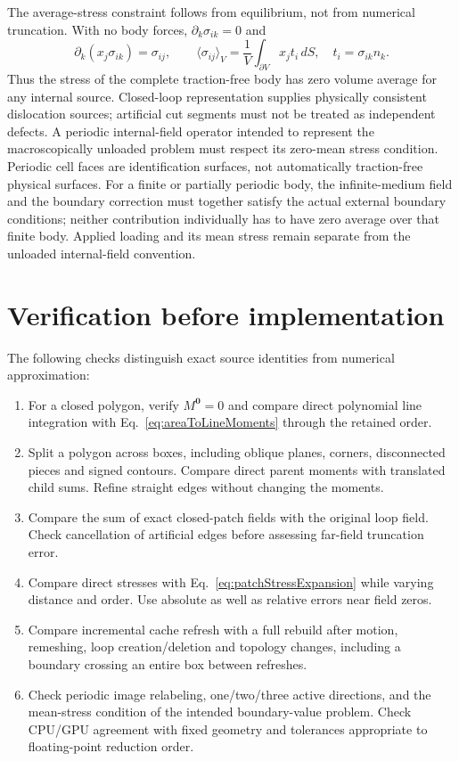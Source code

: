 The average-stress constraint follows from equilibrium, not from numerical truncation. With no body forces, $\partial_k\sigma_{ik}=0$ and
\begin{equation}
 \partial_k(x_j\sigma_{ik})=\sigma_{ij},\qquad
 \boxed{\langle\sigma_{ij}\rangle_V
 =\frac1V\int_{\partial V}x_jt_i\,dS,\quad t_i=\sigma_{ik}n_k.}
 \label{eq:patchAverageStress}
\end{equation}
Thus the stress of the complete traction-free body has zero volume average for any internal source. Closed-loop representation supplies physically consistent dislocation sources; artificial cut segments must not be treated as independent defects. A periodic internal-field operator intended to represent the macroscopically unloaded problem must respect its zero-mean stress condition. Periodic cell faces are identification surfaces, not automatically traction-free physical surfaces. For a finite or partially periodic body, the infinite-medium field and the boundary correction must together satisfy the actual external boundary conditions; neither contribution individually has to have zero average over that finite body. Applied loading and its mean stress remain separate from the unloaded internal-field convention.

\section{Verification before implementation}
The following checks distinguish exact source identities from numerical approximation:
\begin{enumerate}
 \item For a closed polygon, verify $M^{\boldsymbol0}=0$ and compare direct polynomial line integration with Eq.~\eqref{eq:areaToLineMoments} through the retained order.
 \item Split a polygon across boxes, including oblique planes, corners, disconnected pieces and signed contours. Compare direct parent moments with translated child sums. Refine straight edges without changing the moments.
 \item Compare the sum of exact closed-patch fields with the original loop field. Check cancellation of artificial edges before assessing far-field truncation error.
 \item Compare direct stresses with Eq.~\eqref{eq:patchStressExpansion} while varying distance and order. Use absolute as well as relative errors near field zeros.
 \item Compare incremental cache refresh with a full rebuild after motion, remeshing, loop creation/deletion and topology changes, including a boundary crossing an entire box between refreshes.
 \item Check periodic image relabeling, one/two/three active directions, and the mean-stress condition of the intended boundary-value problem. Check CPU/GPU agreement with fixed geometry and tolerances appropriate to floating-point reduction order.
\end{enumerate}
